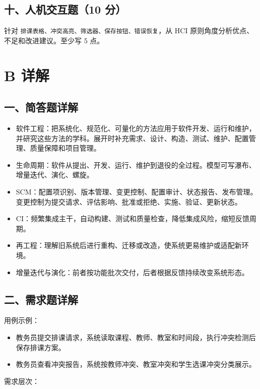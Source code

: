 \documentclass[UTF8,zihao=-4]{ctexart}
\begin{document}
\subsection{十、人机交互题（10 分）}


针对 \texttt{排课表格、冲突高亮、筛选器、保存按钮、错误恢复}，从 HCI 原则角度分析优点、不足和改进建议。至少写 5 点。


\section{B 详解}


\subsection{一、简答题详解}


\begin{itemize}
\item 软件工程：把系统化、规范化、可量化的方法应用于软件开发、运行和维护，并研究这些方法的学科。展开时补充需求、设计、构造、测试、维护、配置管理、质量保障和项目管理。
\item 生命周期：软件从提出、开发、运行、维护到退役的全过程。模型可写瀑布、增量迭代、演化、螺旋。
\item SCM：配置项识别、版本管理、变更控制、配置审计、状态报告、发布管理。变更控制为提交请求、评估影响、批准或拒绝、实施、验证、更新状态。
\item CI：频繁集成主干，自动构建、测试和质量检查，降低集成风险，缩短反馈周期。
\item 再工程：理解旧系统后进行重构、迁移或改造，使系统更易维护或适配新环境。
\item 增量迭代与演化：前者按功能批次交付，后者根据反馈持续改变系统形态。
\end{itemize}



\subsection{二、需求题详解}


用例示例：


\begin{itemize}
\item 教务员提交排课请求，系统读取课程、教师、教室和时间段，执行冲突检测后保存排课方案。
\item 教务员查看冲突报告，系统按教师冲突、教室冲突和学生选课冲突分类展示。
\end{itemize}


需求层次：
\end{document}
